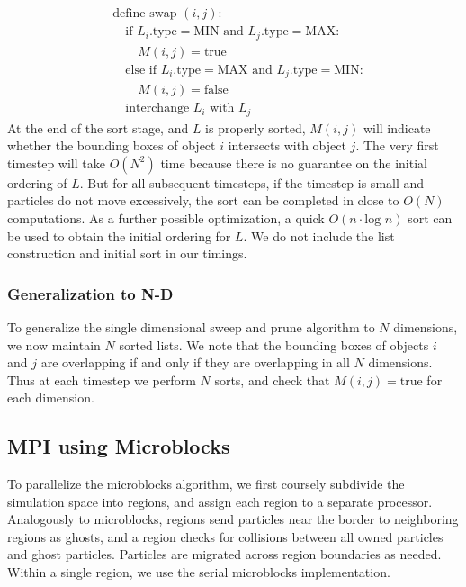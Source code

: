 \documentclass[11pt]{article} %
\begin{document}
\[
\begin{aligned} & \text{define swap }(i,j):\\
 & \quad\text{if }L_{i}\text{.type}=\text{MIN and }L_{j}\text{.type}=\text{MAX}:\\
 & \quad\quad M(i,j)=\text{true}\\
 & \quad\text{else if }L_{i}\text{.type}=\text{MAX and }L_{j}\text{.type}=\text{MIN}:\\
 & \quad\quad M(i,j)=\text{false}\\
 & \quad\text{interchange }L_{i}\text{ with }L_{j}
\end{aligned}
\]
At the end of the sort stage, and $L$ is properly sorted, $M(i,j)$
will indicate whether the bounding boxes of object $i$ intersects
with object $j$. The very first timestep will take $O(N^{2})$ time
because there is no guarantee on the initial ordering of $L$. But
for all subsequent timesteps, if the timestep is small and particles
do not move excessively, the sort can be completed in close to $O(N)$
computations. As a further possible optimization, a quick $O(n\cdot\text{log }n)$
sort can be used to obtain the initial ordering for $L$. We do not include the list construction and initial sort in our timings.

\subsubsection{Generalization to N-D}

To generalize the single dimensional sweep and prune algorithm to
$N$ dimensions, we now maintain $N$ sorted lists. We note that the
bounding boxes of objects $i$ and $j$ are overlapping if and only
if they are overlapping in all $N$ dimensions. Thus at each timestep
we perform $N$ sorts, and check that $M(i,j)=\text{true}$ for each
dimension. 

\subsection{MPI using Microblocks}

To parallelize the microblocks algorithm, we first coursely subdivide the simulation space into regions, and assign each region to a separate processor. Analogously to microblocks, regions send particles near the border to neighboring regions as ghosts, and a region checks for collisions between all owned particles and ghost particles. Particles are migrated across region boundaries as needed. Within a single region, we use the serial microblocks implementation.
\end{document}
